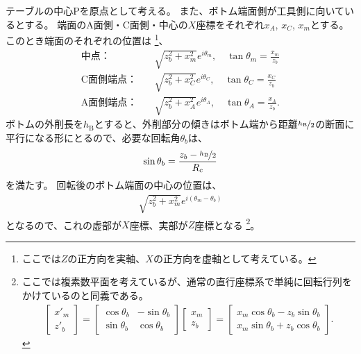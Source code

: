 \clearpage
テーブルの中心Pを原点として考える。
また、ボトム端面側が工具側に向いているとする。
端面のA面側・C面側・中心の$X$座標をそれぞれ$x_A$, $x_C$, $x_m$とする。
このとき端面のそれぞれの位置は
\footnote{ここでは$Z$の正方向を実軸、$X$の正方向を虚軸として考えている。}、
\begin{subequations}
\begin{align*}
  \text{中点：}&\quad \sqrt{z_b^2+x_m^2}e^{i\theta_m}, \quad \tan\theta_m = \frac{x_m}{z_b}\\
  \text{C面側端点：}&\quad \sqrt{z_b^2+x_C^2}e^{i\theta_C}, \quad \tan\theta_C = \frac{x_C}{z_b}\\
  \text{A面側端点：}&\quad \sqrt{z_b^2+x_A^2}e^{i\theta_A}, \quad \tan\theta_A = \frac{x_A}{z_b}.
\end{align*}
\end{subequations}
ボトムの外削長を$h_\mathrm B$とすると、外削部分の傾きはボトム端から距離$\nicefrac{h_\mathrm B}2$の断面に平行になる形にとるので、必要な回転角$\theta_b$は、
\begin{align*}
  \sin\theta_b = \frac{z_b-\nicefrac{h_\mathrm B}2}{R_\mathrm c}
\end{align*}
を満たす。
回転後のボトム端面の中心の位置は、
\begin{align*}
  \sqrt{z_b^2+x_m^2}e^{i(\theta_m-\theta_b)}
\end{align*}
となるので、これの虚部が$X$座標、実部が$Z$座標となる
\footnote{ここでは複素数平面を考えているが、通常の直行座標系で単純に回転行列をかけているのと同義である。
\begin{align*}
  \left[
    \begin{array}{c}
      x'_m\\
      z'_b
    \end{array}
  \right]
  = \left[
    \begin{array}{cc}
      \cos\theta_b & -\sin\theta_b\\
      \sin\theta_b & \cos\theta_b
    \end{array}
  \right]\!\!
  \left[
    \begin{array}{c}
      x_m\\
      z_b
    \end{array}
  \right]
  = \left[
    \begin{array}{c}
      x_m\cos\theta_b-z_b\sin\theta_b\\
      x_m\sin\theta_b+z_b\cos\theta_b
    \end{array}
  \right].
\end{align*}%
}。
